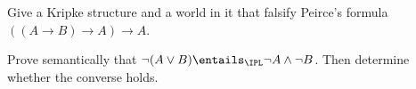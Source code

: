 \begin{exercise}
\label{ex:intuitionistic-logic-01}
Give a Kripke structure and a world in it that falsify Peirce's formula
\(((A\to B)\to A)\to A\).
\end{exercise}

\begin{exercise}
\label{ex:intuitionistic-logic-02}
Prove semantically that
\(\neg(A\lor B)\entails_{\IPL}\neg A\land\neg B\).  Then determine whether the
converse holds.
\end{exercise}

